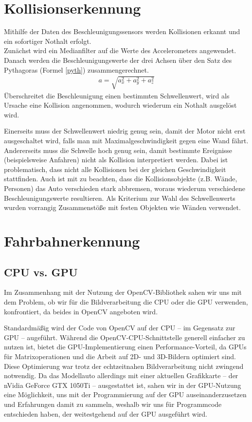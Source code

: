 \documentclass[a4paper,12pt]{report}
\begin{document}
\chapter{Kollisionserkennung}


	Mithilfe der Daten des Beschleunigungssensors werden Kollisionen erkannt und ein sofortiger Nothalt erfolgt.\\
	Zunächst wird ein Medianfilter auf die Werte des Accelerometers angewendet. Danach werden die Beschleunigungswerte der drei Achsen über den Satz des Pythagoras (Formel \ref{pyth}) zusammengerechnet.
	\begin{align}
		a = \sqrt{a_{x}^2+a_{y}^2+a_{z}^2}
		\label{pyth}
	\end{align}
	Überschreitet die Beschleunigung einen bestimmten Schwellenwert, wird als Ursache eine Kollision angenommen, wodurch wiederum ein Nothalt ausgelöst wird.
	
	Einerseits muss der Schwellenwert niedrig genug sein, damit der Motor nicht erst ausgeschaltet wird, falls man mit Maximalgeschwindigkeit gegen eine Wand fährt.
	Andererseits muss die Schwelle hoch genug sein, damit bestimmte Ereignisse (beispielsweise Anfahren) nicht als Kollision interpretiert werden.
	Dabei ist problematisch, dass nicht alle Kollisionen bei der gleichen Geschwindigkeit stattfinden.
	Auch ist mit zu beachten, dass die Kollisionsobjekte (z.B. Wände, Personen) das Auto verschieden stark abbremsen, woraus wiederum verschiedene Beschleunigungswerte resultieren.
	Als Kriterium zur Wahl des Schwellenwerts wurden vorrangig Zusammenstöße mit festen Objekten wie Wänden verwendet.


\chapter{Fahrbahnerkennung}

\section{CPU vs. GPU}
	Im Zusammenhang mit der Nutzung der OpenCV-Bibliothek sahen wir uns mit dem Problem, ob wir für die Bildverarbeitung die CPU oder die GPU verwenden, konfrontiert, da beides in OpenCV angeboten wird.

	Standardmäßig wird der Code von OpenCV auf der CPU -- im Gegensatz zur GPU -- augeführt.
	Während die OpenCV-CPU-Schnittstelle generell einfacher zu nutzen ist, bietet die GPU-Implementierung einen Performance-Vorteil, da GPUs für Matrixoperationen und die Arbeit auf 2D- und 3D-Bildern optimiert sind.
	Diese Optimierung war trotz der echtzeitnahen Bildverarbeitung nicht zwingend notwendig.
	Da das Modellauto allerdings mit einer aktuellen Grafikkarte -- der nVidia GeForce GTX 1050Ti -- ausgestattet ist, sahen wir in der GPU-Nutzung eine Möglichkeit, uns mit der Programmierung auf der GPU auseinanderzusetzen und Erfahrungen damit zu sammeln, weshalb wir uns für Programmcode entschieden haben, der weitestgehend auf der GPU ausgeführt wird.
\end{document}
